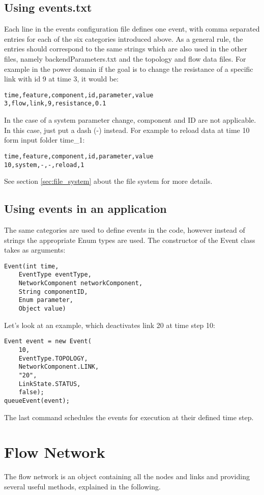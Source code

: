 \documentclass[11pt,fleqn]{book} %
\newcommand{\domain}[1][]{domain#1}
\newcommand{\backendParametersFile}{backendParameters.txt}
\begin{document}
\subsection{Using events.txt}
Each line in the events configuration file defines one event, with comma separated entries for each of the six categories introduced above. As a general rule, the entries should correspond to the same strings which are also used in the other files, namely \backendParametersFile{} and the topology and flow data files. For example in the power \domain{} if the goal is to change the resistance of a specific link with id 9 at time 3, it would be:
\begin{lstlisting}
time,feature,component,id,parameter,value
3,flow,link,9,resistance,0.1
\end{lstlisting}
In the case of a system parameter change, component and ID are not applicable. In this case, just put a dash (-) instead. For example to reload data at time 10 form input folder time\_1:
\begin{lstlisting}
time,feature,component,id,parameter,value
10,system,-,-,reload,1
\end{lstlisting}
See section \ref{sec:file_system} about the file system for more details.

\subsection{Using events in an application}
The same categories are used to define events in the code, however instead of strings the appropriate Enum types are used. The constructor of the Event class takes as arguments:
\begin{lstlisting}
Event(int time, 
	EventType eventType, 
	NetworkComponent networkComponent, 
	String componentID, 
	Enum parameter, 
	Object value)
\end{lstlisting}
Let’s look at an example, which deactivates link 20 at time step 10:
\begin{lstlisting}
Event event = new Event(
	10,
	EventType.TOPOLOGY,
	NetworkComponent.LINK,
	"20",
	LinkState.STATUS,
	false);
queueEvent(event);
\end{lstlisting}
The last command schedules the events for execution at their defined time step.

\section{Flow Network}\label{sec:flow_net}
The flow network is an object containing all the nodes and links and providing several useful methods, explained in the following. 
\end{document}
